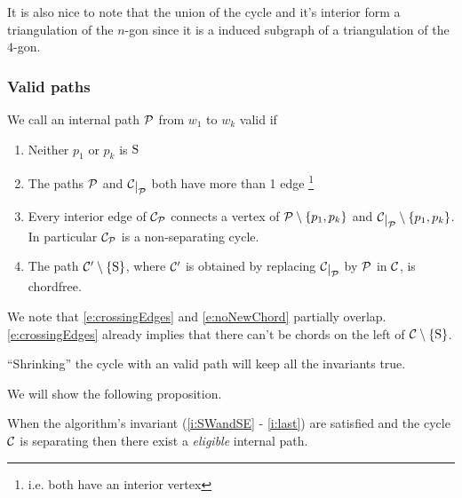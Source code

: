 It is also nice to note that the union of the cycle and it's interior form a triangulation of the $n$-gon since it is a induced subgraph of a triangulation of the $4$-gon.


\subsubsection{Valid paths}

\begin{defi}
We call an internal path $\P$ from $w_1$ to $w_k$ valid if
\begin{enumerate}
 \renewcommand*{\labelenumi}{(E\arabic{enumi})}%
 \renewcommand*{\theenumi}{(E\arabic{enumi})}%


\item Neither $p_1$ or $p_k$ is $\pS$
\label{e:noS}

\item The paths $\P$ and $\restC \P$ both have more than 1 edge \footnote{i.e. both have an interior vertex}
\label{e:longBorders}

\item Every interior edge of $\C_\P$ connects a vertex of $\P\setminus{\braces{p_1,p_k}}$ and $\restC \P \setminus{\braces{p_1,p_k}}$. In particular $\C_\P$ is a non-separating cycle.
\label{e:crossingEdges}

\item The path $\C'\sm{\pS}$, where $\C'$ is obtained by replacing $\restC \P$ by $\P$ in $\C$, is chordfree.
\label{e:noNewChord}

\end{enumerate}
\end{defi}

We note that \ref{e:crossingEdges} and \ref{e:noNewChord} partially overlap. \ref{e:crossingEdges} already implies that there can't be chords on the left of $\cpath$.


\begin{remark}
``Shrinking'' the cycle with an valid path will keep all the invariants true.
\end{remark}

We will show the following proposition.



\begin{thrm}
\label{th:eligExistence}
When the algorithm's invariant (\ref{i:SWandSE} - \ref{i:last}) are satisfied and the cycle $\C$ is separating then there exist a \emph{eligible} internal path.
\end{thrm}




